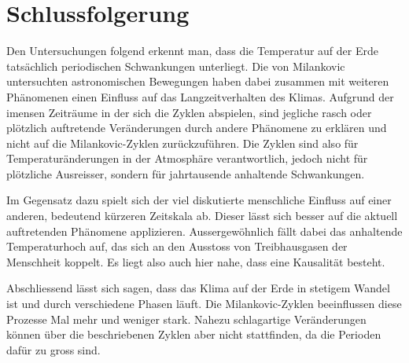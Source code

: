 %
%
%
%
\section{Schlussfolgerung
\label{milankovic:section:Schlussfolgerung}}

Den Untersuchungen folgend erkennt man, dass die Temperatur auf der Erde tatsächlich periodischen Schwankungen unterliegt.
Die von Milankovic untersuchten astronomischen Bewegungen haben dabei zusammen mit weiteren Phänomenen einen Einfluss auf das Langzeitverhalten des Klimas.
Aufgrund der imensen Zeiträume in der sich die Zyklen abspielen, sind jegliche rasch oder plötzlich auftretende Veränderungen durch andere Phänomene zu erklären und nicht auf die Milankovic-Zyklen zurückzuführen. 
Die Zyklen sind also für Temperaturänderungen in der Atmosphäre verantwortlich, jedoch nicht für plötzliche Ausreisser, sondern für jahrtausende anhaltende Schwankungen.

Im Gegensatz dazu spielt sich der viel diskutierte menschliche Einfluss auf einer anderen, bedeutend kürzeren Zeitskala ab.
Dieser lässt sich besser auf die aktuell auftretenden Phänomene applizieren.
Aussergewöhnlich fällt dabei das anhaltende Temperaturhoch auf, das sich an den Ausstoss von Treibhausgasen der Menschheit koppelt.
Es liegt also auch hier nahe, dass eine Kausalität besteht.

Abschliessend lässt sich sagen, dass das Klima auf der Erde in stetigem Wandel ist und durch verschiedene Phasen läuft.
Die Milankovic-Zyklen beeinflussen diese Prozesse Mal mehr und weniger stark.
Nahezu schlagartige Veränderungen können über die beschriebenen Zyklen aber nicht stattfinden, da die Perioden dafür zu gross sind.


